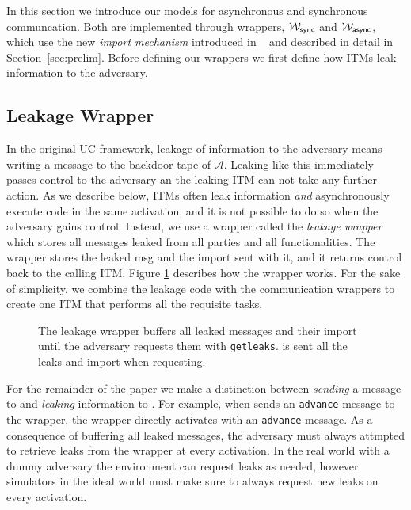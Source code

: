 In this section we introduce our models for asynchronous and synchronous communcation.
Both are implemented through wrappers, $\mathcal{W}_{{\mathsf {sync}}}$ and $\mathcal{W}_{{\mathsf {async}}}$, which use the new {\em import mechanism} introduced in ~\cite{uc} and described in detail in Section~\ref{sec:prelim}.
Before defining our wrappers we first define how ITMs leak information to the adversary.

\subsection{Leakage Wrapper}
In the original UC framework, leakage of information to the adversary means writing a message to the backdoor tape of $\mathcal{A}$.
Leaking like this immediately passes control to the adversary an the leaking ITM can not take any further action. 
As we describe below, ITMs often leak information {\em and} asynchronously execute code in the same activation, and it is not possible to do so when the adversary gains control.
Instead, we use a wrapper called the {\em leakage wrapper} which stores all messages leaked from all parties and all functionalities.
The wrapper stores the leaked msg and the import sent with it, and it returns control back to the calling ITM.
Figure \ref{fig:wrapper:leak} describes how the wrapper works.
For the sake of simplicity, we combine the leakage code with the communication wrappers to create one ITM that performs all the requisite tasks.
\begin{figure}[h]
	
	\caption{The leakage wrapper buffers all leaked messages and their import until the adversary requests them with \texttt{getleaks}.  is sent all the leaks and import when requesting.}
	\label{fig:wrapper:leak}
\end{figure}

For the remainder of the paper we make a distinction between {\em sending} a message to  and {\em leaking} information to .
For example, when  sends an \texttt{advance} message to the wrapper, the wrapper directly activates  with an \texttt{advance} message.
As a consequence of buffering all leaked messages, the adversary must always attmpted to retrieve leaks from the wrapper at every activation.
In the real world with a dummy adversary the environment can request leaks as needed, however simulators in the ideal world must make sure to always request new leaks on every activation.

